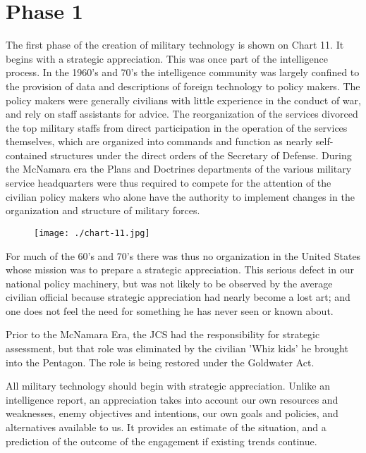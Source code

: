 \section{Phase 1}
The first phase of the creation of military technology is shown on Chart 11. It begins with a strategic appreciation. This was once part of the intelligence process. In the 1960's and 70's the intelligence community was largely confined to the provision of data and descriptions of foreign technology to policy makers. The policy makers were generally civilians with little experience in the conduct of war, and rely on staff assistants for advice. The reorganization of the services divorced the top military staffs from direct participation in the operation of the services themselves, which are organized into commands and function as nearly self-contained structures under the direct orders of the Secretary of Defense. During the McNamara era the Plans and Doctrines departments of the various military service headquarters were thus required to compete for the attention of the civilian policy makers who alone have the authority to implement changes in the organization and structure of military forces.

\begin{figure}[h!]
    \texttt{[image: ./chart-11.jpg]}
    \label{fig:chart-11}
\end{figure}

For much of the 60's and 70's there was thus no organization in the United States whose mission was to prepare a strategic appreciation. This serious defect in our national policy machinery, but was not likely to be observed by the average civilian official because strategic appreciation had nearly become a lost art; and one does not feel the need for something he has never seen or known about.

Prior to the McNamara Era, the JCS had the responsibility for strategic assessment, but that role was eliminated by the civilian 'Whiz kids' he brought into the Pentagon. The role is being restored under the Goldwater Act.

All military technology should begin with strategic appreciation. Unlike an intelligence report, an appreciation takes into account our own resources and weaknesses, enemy objectives and intentions, our own goals and policies, and alternatives available to us. It provides an estimate of the situation, and a prediction of the outcome of the engagement if existing trends continue.


